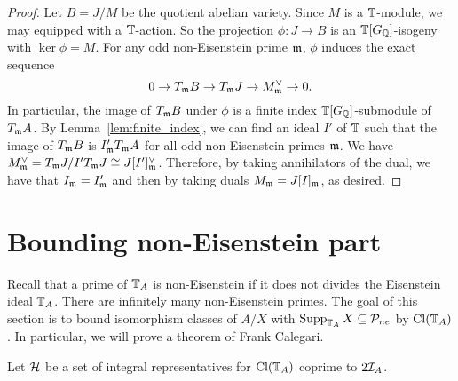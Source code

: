 \documentclass[thesis.tex]{subfiles}
\begin{document}
\begin{proof}
Let $B=J/M$ be the quotient abelian variety. Since $M$ is a $\mathbb{T}$-module,
we may equipped with a $\mathbb{T}$-action. So the projection $\phi:J \to B$ is an
$\mathbb{T}[G_{\mathbb{Q}}]$-isogeny with $\ker\phi = M$. For any odd non-Eisenstein prime
$\mathfrak{m}$, $\phi$ induces the exact sequence
\[
    0 \to T_{\mathfrak{m}} B \to T_{\mathfrak{m}} J \to M^\vee _{\mathfrak{m}} \to 0.
\]
In particular, the image of $T_{\mathfrak{m}} B$ under $\phi$ is a finite index
$\mathbb{T}[G_{\mathbb{Q}}]$-submodule of $T_{\mathfrak{m}} A$. By Lemma~\ref{lem:finite_index}, we can find
an ideal $I'$ of $\mathbb{T}$ such that the image of $T_{\mathfrak{m}} B$ is $I' _{\mathfrak{m}} T_{\mathfrak{m}} A$
for all odd non-Eisenstein primes $\mathfrak{m}$. We have $M^\vee _{\mathfrak{m}} = T_{\mathfrak{m}} J / I'
T_{\mathfrak{m}} J\cong J[I']_{\mathfrak{m}} ^\vee$. Therefore, by taking annihilators of the dual,
we have that $I_{\mathfrak{m}} = I'_{\mathfrak{m}}$ and then by taking duals $M_{\mathfrak{m}} = J[I]_{\mathfrak{m}}$, as
desired.
\end{proof}

\section{Bounding non-Eisenstein part}%
\label{sec:bounding_non_eisenstein_part}

Recall that a prime of $\mathbb{T}_A$ is non-Eisenstein if it does not divides the
Eisenstein ideal $\mathbb{T}_A$. There are infinitely many non-Eisenstein primes. The
goal of this section is to bound isomorphism classes of $A/X$ with
$\operatorname{Supp}_{\mathbb{T}_A} X\subseteq \mathcal{P}_{ne}$ by $\operatorname{Cl}(\mathbb{T}_A)$. In particular, we will
prove a theorem of Frank Calegari.

Let $\mathcal{H}$ be a set of integral representatives for $\operatorname{Cl}(\mathbb{T}_A)$ coprime to
$2\mathcal{I}_A$. 
\end{document}
